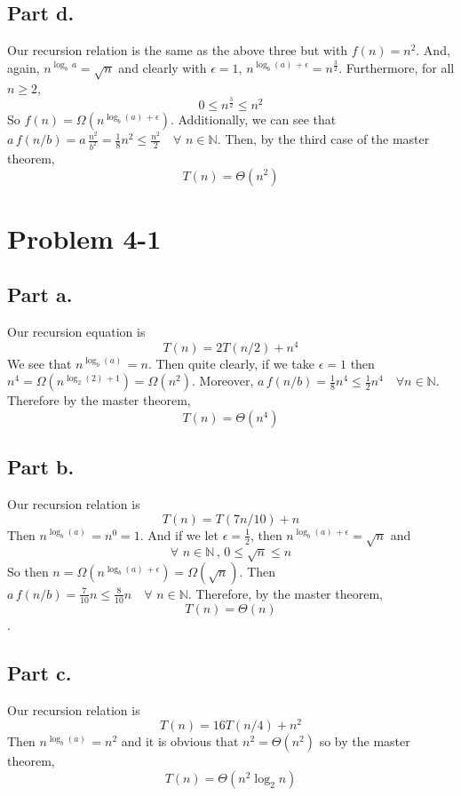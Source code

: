 \documentclass{article}
\newcommand{\nlg}[3]{n^{\log_{#2}(#1) \, #3}}
\begin{document}
    \subsection*{Part d.}
      Our recursion relation is the same as the above three but with $f(n) = n^2$.
      And, again, $n^{\log_b\,a} = \sqrt{n}$ and clearly with $\epsilon = 1$,
      $\nlg{a}{b}{+\epsilon} = n^{\frac{3}{2}}$.
      Furthermore, for all $ n \geq 2$, $$0 \leq n^{\frac{3}{2}} \leq n^2 $$
      So $f(n) = \Omega(\nlg{a}{b}{+\epsilon})$.
      Additionally, we can see that $a \, f(n/b) = a \, \frac{n^2}{b^2} = \frac{1}{8} n^2 \leq \frac{n^2}{2} \quad \forall \,\, n \in \mathbb{N}$.
      Then, by the third case of the master theorem, $$T(n) = \Theta(n^2)$$

  \section*{Problem 4-1}
    \subsection*{Part a.}
      Our recursion equation is $$T(n) = 2 T(n/2) + n^4$$
      We see that $\nlg{a}{b}{} = n$.
      Then quite clearly, if we take $\epsilon = 1$ then $n^4 = \Omega(\nlg{2}{2}{+1}) = \Omega(n^2)$.
      Moreover, $a \, f(n/b) = \frac{1}{8} n^4 \leq \frac{1}{2} n^4 \quad \forall n \in \mathbb{N}$.
      Therefore by the master theorem, $$T(n) = \Theta(n^4)$$

    \subsection*{Part b.}
      Our recursion relation is $$ T(n) = T(7n/10) + n$$
      Then $\nlg{a}{b}{} = n^0 = 1$.
      And if we let $\epsilon = \frac{1}{2}$, then $\nlg{a}{b}{+\epsilon} = \sqrt{n}$ and $$ \forall \,\, n \in \mathbb{N}\,,\, 0 \leq \sqrt{n} \leq n$$
      So then $n = \Omega(\nlg{a}{b}{+\epsilon}) = \Omega(\sqrt{n})$.
      Then $a \, f(n/b) = \frac{7}{10} n \leq \frac{8}{10} n \quad \forall \,\, n \in \mathbb{N}$.
      Therefore, by the master theorem, $$T(n) = \Theta(n)$$.

    \subsection*{Part c.}
      Our recursion relation is $$T(n) = 16 T(n/4) +  n^2$$
      Then $\nlg{a}{b}{} = n^2 $ and it is obvious that $n^2 = \Theta(n^2)$ so by the master theorem, $$T(n) = \Theta(n^2 \log_2 n)$$
\end{document}
